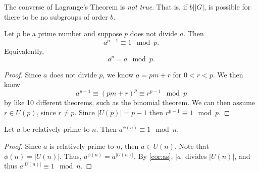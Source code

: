 \begin{remark}
	The converse of Lagrange's Theorem is \emph{not true}. That is, if $b|\left| G \right| $, is possible for there to be no subgroups of order $b$.
\end{remark}
\begin{theorem}\label{thm:fermat}
	Let $p$ be a prime number and suppose $p$ does not divide $a$. Then
	\[
		a^{p-1}\equiv 1\mod{p}
	.\]
	Equivalently,
	\[
		a^p=a\mod{p}
	.\]
\end{theorem}
\begin{proof}
	Since $a$ does not divide $p$, we know $a=pm+r$ for $0<r<p$. We then know
	\[
	a^{p-1} \equiv \left( pm+r \right) ^p\equiv  r^{p-1}\mod{p}
	\]
	by like 10 different theorems, such as the binomial theorem. We can then assume $r\in U(p)$, since $r\neq p$. Since $\left| U(p) \right| =p-1$ then $r^{p-1}\equiv 1\mod{p}$.
\end{proof}
\begin{theorem}\label{thm:lask}
	Let $a$ be relatively prime to $n$. Then $a^{\phi (n)}\equiv 1\mod{n}$.
\end{theorem}
\begin{proof}
	Since $a$ is relatively prime to $ n$, then $a\in U(n)$. Note that $\phi (n)=\left| U(n) \right| $. Thus, $a^{\phi (n)}=a^{\left| U(n) \right| }$. By \ref{cor:as}, $\left| a \right| $ divides $\left| U(n) \right| $, and thus $a^{\left| U(n) \right| }\equiv 1\mod{n}$.
\end{proof}
